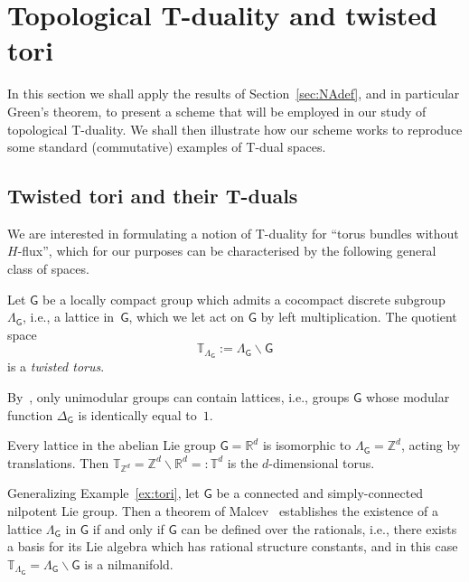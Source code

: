 \documentclass[pdftex]{sigma}
\numberwithin{equation}{section}
\newcommand{\sfG}{\mathsf{G}}
\newcommand{\zed}{{\mathbb Z}} %
\newcommand{\real}{{\mathbb R}} %
\newcommand{\torus}{{\mathbb T}} %
\begin{document}
\section{Topological T-duality and twisted tori}\label{sec:TopTtorus}

In this section we shall apply the results of Section~\ref{sec:NAdef}, and in particular
Green's theorem, to present a scheme
that will be employed in our study of topological T-duality. We shall
then illustrate how our scheme works to reproduce some standard
(commutative) examples of T-dual spaces.

\subsection{Twisted tori and their T-duals}\label{sec:twistedtori}

We are interested in formulating a notion of T-duality for
``torus bundles without $H$-flux'', which for our purposes can be
characterised by the following general class of spaces.

\begin{Definition}
Let $\sfG$ be a locally compact group which admits a
cocompact discrete subgroup $\Lambda_\sfG$, i.e., a lattice in~$\sfG$, which we let act on $\sfG$ by left
multiplication. The quotient space
\[
\torus_{\Lambda_\sfG}:=\Lambda_\sfG\backslash \sfG
\]
is a \emph{twisted torus}.
\end{Definition}

By~\cite[Lemma~6.2]{Milnor1976}, only unimodular groups can contain lattices, i.e., groups $\sfG$ whose
modular function $\Delta_\sfG$ is identically equal to~$1$.

\begin{Example}[tori]\label{ex:tori}
Every lattice in the abelian Lie group $\sfG=\real^d$ is
isomorphic to $\Lambda_\sfG=\zed^d$, acting by translations. Then
$\torus_{\zed^d}=\zed^d\backslash\real^d=:\torus^d$ is the $d$-dimensional torus.
\end{Example}

\begin{Example}[nilmanifolds]\label{ex:nilmanifolds}
Generalizing Example~\ref{ex:tori}, let $\sfG$ be a connected and simply-connected nilpotent Lie group. Then a theorem of
Malcev~\cite[Theorem~2.12]{Raghunathan1972} establishes the existence
of a lattice $\Lambda_\sfG$ in $\sfG$ if and only if
$\sfG$ can be defined over the rationals,
i.e., there exists a basis for its Lie algebra which has rational
structure constants, and in this case $\torus_{\Lambda_\sfG}=\Lambda_\sfG\backslash \sfG$ is a nilmanifold.
\end{Example}
\end{document}
